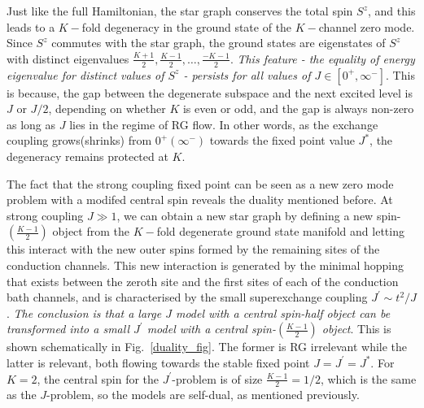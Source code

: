 \documentclass[12pt]{revtex4-2}
\begin{document}
Just like the full Hamiltonian, the star graph conserves the total spin \(S^z\), and this leads to a \(K-\)fold degeneracy in the ground state of the \(K-\)channel zero mode. Since \(S^z\) commutes with the star graph, the ground states are eigenstates of \(S^z\) with distinct eigenvalues \(\frac{K+1}{2}, \frac{K-1}{2},\ldots,\frac{-K-1}{2}\). \textit{This feature - the equality of energy eigenvalue for distinct values of \(S^z\) - persists for all values of \(J \in \left[0^+, \infty^-\right]\)}. This is because, the gap between the degenerate subspace and the next excited level is \(J\) or \(J/2\), depending on whether \(K\) is even or odd, and the gap is always non-zero as long as \(J\) lies in the regime of RG flow. In other words, as the exchange coupling grows(shrinks) from \(0^+\left(\infty^-\right)\) towards the fixed point value \(J^*\), the degeneracy remains protected at \(K\).

The fact that the strong coupling fixed point can be seen as a new zero mode problem with a modifed central spin reveals the duality mentioned before. At strong coupling \(J \gg 1\), we can obtain a new star graph by defining a new spin-\(\left(\frac{K-1}{2}\right)\) object from the \(K-\)fold degenerate ground state manifold and letting this interact with the new outer spins formed by the remaining sites of the conduction channels. This new interaction is generated by the minimal hopping that exists between the zeroth site and the first sites of each of the conduction bath channels, and is characterised by the small superexchange coupling \(J^\prime \sim t^2/J\). \textit{The conclusion is that a large \(J\) model with a central spin-half object can be transformed into a small \(J^\prime\) model with a central spin-\(\left(\frac{K-1}{2}\right)\) object}. This is shown schematically in Fig.~\ref{duality_fig}. The former is RG irrelevant while the latter is relevant, both flowing towards the stable fixed point \(J = J^\prime = J^*\). For \(K=2\), the central spin for the \(J^\prime\)-problem is of size \(\frac{K-1}{2} = 1/2\), which is the same as the \(J\)-problem, so the models are self-dual, as mentioned previously.
\end{document}
